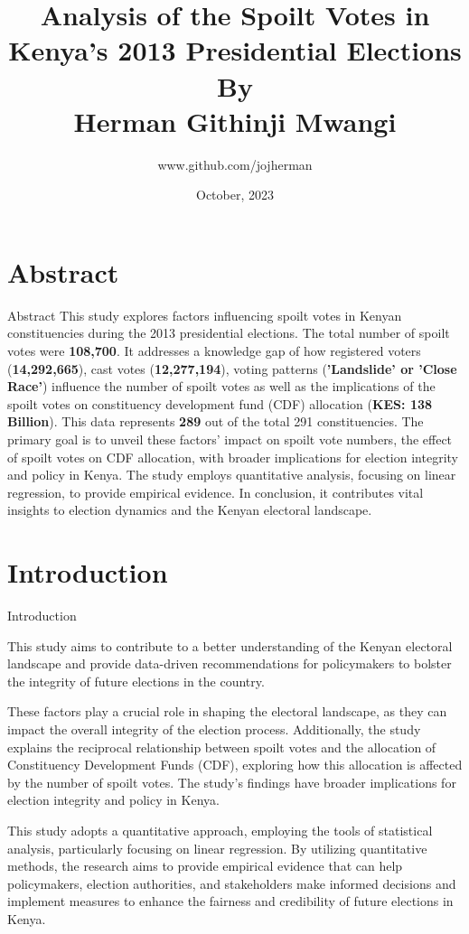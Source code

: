 \documentclass{beamer}
\title{Analysis of the Spoilt Votes in Kenya's 2013 Presidential Elections
\\By
\\Herman Githinji Mwangi}
\author{www.github.com/jojherman}
\institute[]{Junior Researcher\\Berlin, Germany}
\date{October, 2023}
\begin{document}


\begin{frame}
  \titlepage
\end{frame}

\section{Abstract}


\begin{frame}{Abstract}
  This study explores factors influencing spoilt votes in Kenyan constituencies during the 2013 presidential elections. The total number of spoilt votes were \textbf{108,700}. It addresses a knowledge gap of how registered voters (\textbf{14,292,665}), cast votes (\textbf{12,277,194}), voting patterns (\textbf{'Landslide' or 'Close Race'}) influence the number of spoilt votes as well as the implications of the spoilt votes on constituency development fund (CDF) allocation (\textbf{KES: 138 Billion}). This data represents \textbf{289} out of the total 291 constituencies. The primary goal is to unveil these factors' impact on spoilt vote numbers, the effect of spoilt votes on CDF allocation, with broader implications for election integrity and policy in Kenya. The study employs quantitative analysis, focusing on linear regression, to provide empirical evidence. In conclusion, it contributes vital insights to election dynamics and the Kenyan electoral landscape.
\end{frame}

\section{Introduction}

\begin{frame}{Introduction}

This study aims to contribute to a better understanding of the Kenyan electoral landscape and provide data-driven recommendations for policymakers to bolster the integrity of future elections in the country. 

These factors play a crucial role in shaping the electoral landscape, as they can impact the overall integrity of the election process. Additionally, the study explains the reciprocal relationship between spoilt votes and the allocation of Constituency Development Funds (CDF), exploring how this allocation is affected by the number of spoilt votes. The study's findings have broader implications for election integrity and policy in Kenya.

This study adopts a quantitative approach, employing the tools of statistical analysis, particularly focusing on linear regression. By utilizing quantitative methods, the research aims to provide empirical evidence that can help policymakers, election authorities, and stakeholders make informed decisions and implement measures to enhance the fairness and credibility of future elections in Kenya.
\end{frame}
\end{document}
